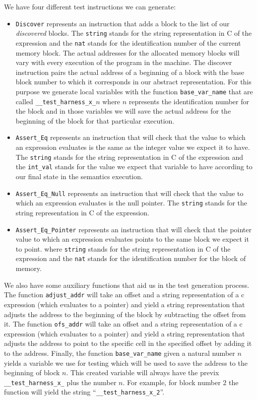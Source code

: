 We have four different test instructions we can generate:

\begin{itemize}
  \item{\verb|Discover| represents an instruction that adds a block to the list of our \textit{discovered} blocks.
  The \verb|string| stands for the string representation in C of the expression and the \verb|nat| stands for the identification number of the current memory block.
  The actual addresses for the allocated memory blocks will vary with every execution of the program in the machine.
  The discover instruction pairs the actual address of a beginning of a block with the base block number to which it corresponds in our abstract representation.
  For this purpose we generate local variables with the function \verb|base_var_name| that are called \verb|__test_harness_x_|$n$ where $n$ represents the identification number for the block and in those variables we will save the actual address for the beginning of the block for that particular execution.}
  \item{\verb|Assert_Eq| represents an instruction that will check that the value to which an expression evaluates is the same as the integer value we expect it to have.
  The \verb|string| stands for the string representation in C of the expression and the \verb|int_val| stands for the value we expect that variable to have according to our final state in the semantics execution.}
  \item{\verb|Assert_Eq_Null| represents an instruction that will check that the value to which an expression evaluates is the null pointer.
  The \verb|string| stands for the string representation in C of the expression.}
  \item{\verb|Assert_Eq_Pointer| represents an instruction that will check that the pointer value to which an expression evaluates points to the same block we expect it to point.
  where \verb|string| stands for the string representation in C of the expression and the \verb|nat| stands for the identification number for the block of memory.}
\end{itemize}

We also have some auxiliary functions that aid us in the test generation process.
The function \verb|adjust_addr| will take an offset and a string representation of a c expression (which evaluates to a pointer) and yield a string representation that adjusts the address to the beginning of the block by subtracting the offset from it.
The function \verb|ofs_addr| will take an offset and a string representation of a c expression (which evaluates to a pointer) and yield a string representation that adjusts the address to point to the specific cell in the specified offset by adding it to the address.
Finally, the function \verb|base_var_name| given a natural number $n$ yields a variable we use for testing which will be used to save the address to the beginning of block $n$.
This created variable will always have the previx \verb|__test_harness_x_| plus the number $n$.
For example, for block number $2$ the function will yield the string ``\verb|__test_harness_x_2|''.


